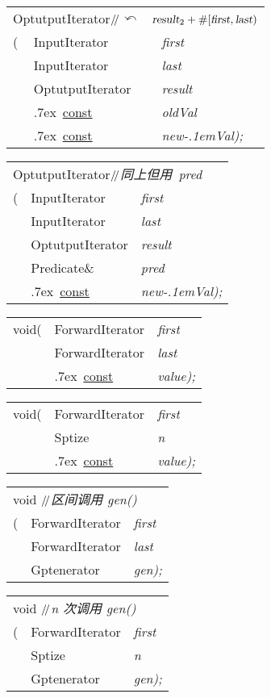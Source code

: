 \documentclass[c5size,landscape,twoside,a4paper]{ctexart}
\makeatletter
\newif\ifafour
\newif\ifletter
\let\ifafour\iftrue
\let\ifletter\iffalse
\newcommand{\<}{\ensuremath{\langle}}
\renewcommand{\>}{\ensuremath{\rangle}}
\newcommand{\ForwardIterator}{{\bbfont F}{\concfont orwardIterator}}
\newcommand{\Generator}{{\bbfont G}\hs{\concfont enerator}}
\newcommand{\InputIterator}{{\bbfont I}{\concfont nputIterator}}
\newcommand{\OutputIterator}{{\bbfont O}{\hs}{\concfont utputIterator}}
\newcommand{\Predicate}{{{\bbfont P}\concfont redicate}}
\newcommand{\Size}{{{\bbfont S}\hs\concfont ize}}
\renewcommand{\T}{{\bbfont T}}
\newcommand{\hs}[1][1]{\hskip #1pt}
\newcommand{\newVal}{new{\kern-.1em}Val}
\newcommand{\slsl}{\ensuremath{/\kern-.2em/}} %
\newcommand{\textComm}[1]{\textsl{\textsf{#1}}}
\newcommand{\Cppslsl}{\enskip\slsl\enskip}
\newcommand{\CppComm}[1]{\Cppslsl\textComm{#1}}
\newcommand{\const}{\mbox{}\raise.7ex\hbox{{%
                    \tiny \underline{\underline{\textsf{const}}}}}\hskip.2em}
\newcommand{\ret}{\ensuremath{\curvearrowleft}}
\newcommand{\asbutusing}{同上但用}
\newcommand{\butpred}{\asbutusing\ \textsl{pred}}
\newcommand{\commcr}{{\normalfont{,}} \\}
\newcommand{\doColorNamed}[2]{\color[named]{#1}{#2}}
\newcommand{\doColorNamed}[2]{#2}
\newcommand{\StrongClrBf}[1]{{\small\doColorNamed{Red}\textbf{#1}}}
\newenvironment{funcdec}
 { %
   \ifletter
     \setlength{\extrarowheight}{-2pt}
   \else
     \setlength{\extrarowheight}{-4pt}
   \fi
        \setlength{\tabcolsep}{0pt}
   \begin{tabular}{ll @{\quad}>{\slshape}l}}
 {\end{tabular}}
\newcommand{\lp}{(}
\newcommand{\rp}{)}
\newcommand{\lbrk}{[}
\newcommand{\parVal}[2]{{\slshape#1}{\textnormal#2}}
\newcommand{\lastPar}[1]{\parVal{#1}{\rp;}}
\newcommand{\range}[2]{\lbrk#1,#2\rp}
\newcommand{\flRange}{\range{{\textsl{first}}}{{\textsl{last}}}}
\makeatother
\begin{document}
\begin{multicols}{4}
\begin{funcdec}
\multicolumn{3}{l}{\OutputIterator\CppComm{\ret\ %
                   \(\textsl{result}_2+\#\flRange\)}}\\
\StrongClrBf{replace_copy}\lp& \InputIterator  & first\commcr
                             & \InputIterator  & last\commcr
                             & \OutputIterator & result\commcr
                             & \const\ \T\&     & oldVal\commcr
                             & \const\ \T\&     & \lastPar{\newVal}
\end{funcdec}


\begin{funcdec}
\multicolumn{3}{l}{\OutputIterator\CppComm{\butpred}}\\
\StrongClrBf{replace_copy_if}\lp& \InputIterator  & first\commcr
                               & \InputIterator  & last\commcr
                               & \OutputIterator & result\commcr
                               & \Predicate\&     & pred\commcr
                               & \const\ \T\&     & \lastPar{\newVal}
\end{funcdec}


\begin{funcdec}
void\enskip \StrongClrBf{fill}\lp& \ForwardIterator & first\commcr
                     & \ForwardIterator & last\commcr
                     & \const\ \T\&     & \lastPar{value}
\end{funcdec}


\begin{funcdec}
void\enskip \StrongClrBf{fill_n}\lp& \ForwardIterator & first\commcr
                     & \Size             & n\commcr
                     & \const\ \T\&      & \lastPar{value}
\end{funcdec}


\begin{funcdec}
\multicolumn{3}{l}{void \CppComm{区间调用 \textsl{gen}\textrm{()}}}\\
\StrongClrBf{generate}\lp& \ForwardIterator & first\commcr
                         & \ForwardIterator & last\commcr
                         & \Generator       & \lastPar{gen}
\end{funcdec}


\begin{funcdec}
\multicolumn{3}{l}{void \CppComm{\textsl{n} 次调用 \textsl{gen}\textrm{()}}}\\
\StrongClrBf{generate_n}\lp& \ForwardIterator & first\commcr
                           & \Size            & n\commcr
                           & \Generator       & \lastPar{gen}
\end{funcdec}


\end{multicols}
\end{document}
